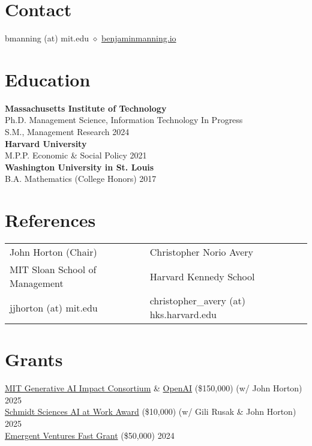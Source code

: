 \documentclass[margin,line,pifont,palatino,courier, 9pt]{res}
\begin{document}
\begin{resume}


\normalsize


\section{\sc Contact}
bmanning (at) mit.edu $\diamond$ \href{https://benjaminmanning.io/}{benjaminmanning.io}

\section{\sc Education}
{\bf Massachusetts Institute of Technology}\\
Ph.D. Management Science, Information Technology \hfill In Progress \\
S.M., Management Research \hfill 2024\vspace{2mm}\\
{\bf Harvard University}\\
M.P.P. Economic \& Social Policy \hfill 2021\vspace{2mm}\\
{\bf Washington University in St. Louis}\\
B.A. Mathematics (College Honors) \hfill 2017

\section{\sc References}
\vspace{.15cm}
\begin{tabular}{@{}p{2.6in}p{2.75in}}
John Horton (Chair)& Christopher Norio Avery\\
MIT Sloan School of Management & Harvard Kennedy School \\
jjhorton (at) mit.edu & christopher\_avery (at) hks.harvard.edu\\
\end{tabular}

\section{\sc Grants}
\href{https://computing.mit.edu/research/mit-generative-ai-impact-consortium/}{MIT Generative AI Impact Consortium} \& \href{https://openai.com/}{OpenAI} (\$150,000) (w/ John Horton) \hfill 2025 \\
\href{https://www.schmidtsciences.org/ai-at-work/}{Schmidt Sciences AI at Work Award} (\$10,000) (w/ Gili Rusak \& John Horton) \hfill 2025 \\
\href{https://www.mercatus.org/emergent-ventures}{Emergent Ventures Fast Grant} (\$50,000) \hfill 2024 


\end{resume}
\end{document}
